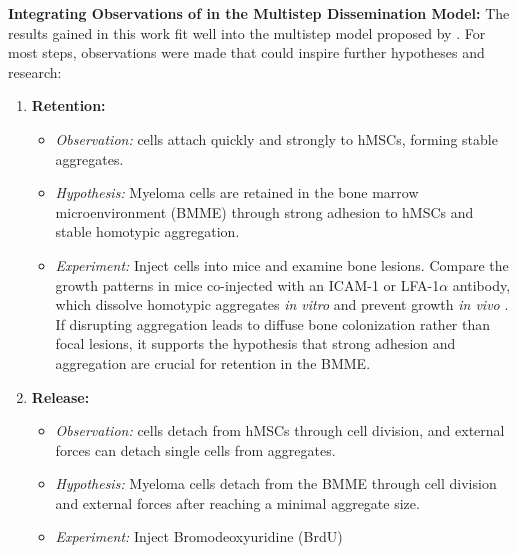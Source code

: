 \textbf{Integrating Observations of \INA in the Multistep Dissemination Model:}
The results gained in this work fit well into the multistep model proposed by
\citet{zeissigTumourDisseminationMultiple2020}. For most steps, observations
were made that could inspire further hypotheses and research:


\begin{enumerate}
      \item \textbf{Retention:}
            \begin{itemize}
                  \item \textit{Observation:} \INA cells attach quickly and
                        strongly to \acp{hMSC}, forming stable aggregates.
                  \item \textit{Hypothesis:} Myeloma cells are retained in the
                        bone marrow microenvironment (BMME) through strong adhesion to
                        \acp{hMSC} and stable homotypic aggregation.
                  \item \textit{Experiment:} Inject \INA cells into mice and
                        examine bone lesions. Compare the growth patterns in mice
                        co-injected with an ICAM-1 or LFA-1$\alpha$ antibody, which
                        dissolve homotypic aggregates \textit{in vitro} and prevent
                        \INA growth \textit{in vivo}
                        \cite{kawanoHomotypicCellAggregations1991a,
                              klauszNovelFcengineeredHuman2017}. If disrupting aggregation
                        leads to diffuse bone colonization rather than focal lesions,
                        it supports the hypothesis that strong adhesion and
                        aggregation are crucial for retention in the \ac{BMME}.
            \end{itemize}
      \item \textbf{Release:}
            \begin{itemize}
                  \item \textit{Observation:} \INA cells detach from \acp{hMSC}
                        through cell division, and external forces can detach single
                        cells from \INA aggregates.
                  \item \textit{Hypothesis:} Myeloma cells detach from the BMME
                        through cell division and external forces after reaching a
                        minimal aggregate size.
                  \item \textit{Experiment:} Inject Bromodeoxyuridine (BrdU)

\end{itemize}
\end{enumerate}
